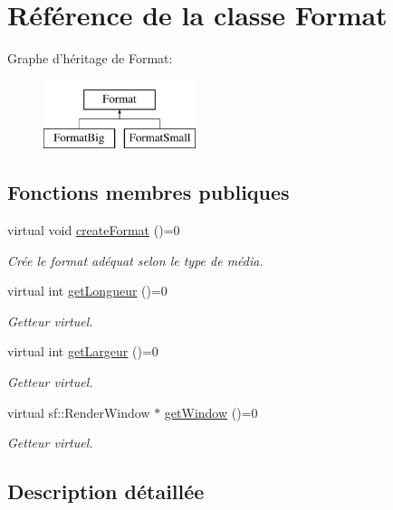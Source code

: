 \hypertarget{classFormat}{\section{Référence de la classe Format}
\label{classFormat}
}
Graphe d'héritage de Format\+:\begin{figure}[H]
\begin{center}
\leavevmode
\includegraphics[height=2.000000cm]{classFormat}
\end{center}
\end{figure}
\subsection*{Fonctions membres publiques}
\begin{DoxyCompactItemize}
\item 
virtual void \hyperlink{classFormat_a07f4f6f3b4c5182a63d684c4a20b9d96}{create\+Format} ()=0
\begin{DoxyCompactList}\small\item\em Crée le format adéquat selon le type de média. \end{DoxyCompactList}\item 
virtual int \hyperlink{classFormat_ad5474275e85a8a47b5f0da28d7020283}{get\+Longueur} ()=0
\begin{DoxyCompactList}\small\item\em Getteur virtuel. \end{DoxyCompactList}\item 
virtual int \hyperlink{classFormat_a96150ade441ed68e056c20db86fd1607}{get\+Largeur} ()=0
\begin{DoxyCompactList}\small\item\em Getteur virtuel. \end{DoxyCompactList}\item 
virtual sf\+::\+Render\+Window $\ast$ \hyperlink{classFormat_a71418db76d6925708d403a1cd31b74f0}{get\+Window} ()=0
\begin{DoxyCompactList}\small\item\em Getteur virtuel. \end{DoxyCompactList}\end{DoxyCompactItemize}


\subsection{Description détaillée}


